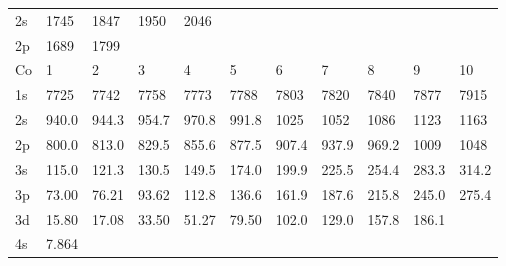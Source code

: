 \begin{table}
\begin{tabular}{lllllllllll}
2s&  1745&  1847&  1950&  2046\\
2p&  1689&  1799\\
\hline
Co&
1&   2&   3&   4&   5&   6&   7&   8&   9&  10\\
\hline
1s&  7725&  7742&  7758&  7773&  7788&  7803&
7820&  7840&  7877&  7915\\
2s& 940.0& 944.3& 954.7& 970.8& 991.8&  1025&  1052&  1086&
1123&  1163\\
2p& 800.0& 813.0& 829.5& 855.6& 877.5& 907.4& 937.9& 969.2& 1009&  1048\\
3s&
115.0& 121.3& 130.5& 149.5& 174.0& 199.9& 225.5& 254.4& 283.3& 314.2\\
3p& 73.00& 76.21&
93.62& 112.8& 136.6& 161.9& 187.6& 215.8& 245.0& 275.4\\
3d& 15.80& 17.08& 33.50& 51.27&
79.50& 102.0& 129.0& 157.8& 186.1\\
4s& 7.864\\
\hline
\end{tabular}
\end{table}




